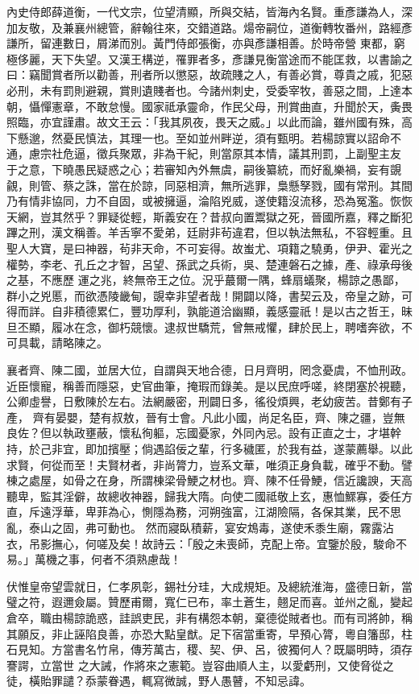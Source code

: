 \begin{pinyinscope}
 內史侍郎薛道衡，一代文宗，位望清顯，所與交結，皆海內名賢。重彥謙為人，深加友敬，及兼襄州總管，辭翰往來，交錯道路。煬帝嗣位，道衡轉牧番州，路經彥謙所，留連數日，屑涕而別。黃門侍郎張衡，亦與彥謙相善。於時帝營
 東都，窮極侈麗，天下失望。又漢王構逆，罹罪者多，彥謙見衡當途而不能匡救，以書諭之曰：竊聞賞者所以勸善，刑者所以懲惡，故疏賤之人，有善必賞，尊貴之戚，犯惡必刑，未有罰則避親，賞則遺賤者也。今諸州刺史，受委宰牧，善惡之間，上達本朝，懾憚憲章，不敢怠慢。國家祗承靈命，作民父母，刑賞曲直，升聞於天，夤畏照臨，亦宜謹肅。故文王云：「我其夙夜，畏天之威。」以此而論，雖州國有殊，高下懸邈，然憂民慎法，其理一也。至如並州畔逆，須有甄明。若楊諒實以詔命不通，慮宗社危逼，徵兵聚眾，非為干紀，則當原其本情，議其刑罰，上副聖主友
 于之意，下曉愚民疑惑之心；若審知內外無虞，嗣後纂統，而好亂樂禍，妄有覬覦，則管、蔡之誅，當在於諒，同惡相濟，無所逃罪，梟懸孥戮，國有常刑。其間乃有情非協同，力不自固，或被擁逼，淪陷兇威，遂使籍沒流移，恐為冤濫。恢恢天網，豈其然乎？罪疑從輕，斯義安在？昔叔向置鬻獄之死，晉國所嘉，釋之斷犯蹕之刑，漢文稱善。羊舌寧不愛弟，廷尉非茍違君，但以執法無私，不容輕重。且聖人大寶，是曰神器，茍非天命，不可妄得。故蚩尤、項籍之驍勇，伊尹、霍光之權勢，李老、孔丘之才智，呂望、孫武之兵術，吳、楚連磐石之據，產、祿承母後之基，不應歷
 運之兆，終無帝王之位。況乎蕞爾一隅，蜂扇蟻聚，楊諒之愚鄙，群小之兇慝，而欲憑陵畿甸，覬幸非望者哉！開闢以降，書契云及，帝皇之跡，可得而詳。自非積德累仁，豐功厚利，孰能道洽幽顯，義感靈祇！是以古之哲王，昧旦丕顯，履冰在念，御朽競懷。逮叔世驕荒，曾無戒懼，肆於民上，聘嗜奔欲，不可具載，請略陳之。



 襄者齊、陳二國，並居大位，自謂與天地合德，日月齊明，罔念憂虞，不恤刑政。近臣懷寵，稱善而隱惡，史官曲筆，掩瑕而錄美。是以民庶呼嗟，終閉塞於視聽，公卿虛譽，日敷陳於左右。法網嚴密，刑闢日多，徭役煩興，老幼疲苦。昔鄭有子產，
 齊有晏嬰，楚有叔敖，晉有士會。凡此小國，尚足名臣，齊、陳之疆，豈無良佐？但以執政壅蔽，懷私徇軀，忘國憂家，外同內忌。設有正直之士，才堪幹持，於己非宜，即加擯壓；倘遇諂佞之輩，行多穢匿，於我有益，遂蒙薦舉。以此求賢，何從而至！夫賢材者，非尚膂力，豈系文華，唯須正身負載，確乎不動。譬棟之處屋，如骨之在身，所謂棟梁骨鯁之材也。齊、陳不任骨鯁，信近讒諛，天高聽卑，監其淫僻，故總收神器，歸我大隋。向使二國祗敬上玄，惠恤鰥寡，委任方直，斥遠浮華，卑菲為心，惻隱為務，河朔強富，江湖險隔，各保其業，民不思亂，泰山之固，弗可動也。
 然而寢臥積薪，宴安鴆毒，遂使禾黍生廟，霧露沾衣，吊影撫心，何嗟及矣！故詩云：「殷之未喪師，克配上帝。宜鑒於殷，駿命不易。」萬機之事，何者不須熟慮哉！



 伏惟皇帝望雲就日，仁孝夙彰，錫社分珪，大成規矩。及總統淮海，盛德日新，當璧之符，遐邇僉屬。贊歷甫爾，寬仁已布，率土蒼生，翹足而喜。並州之亂，變起倉卒，職由楊諒詭惑，詿誤吏民，非有構怨本朝，棄德從賊者也。而有司將帥，稱其願反，非止誣陷良善，亦恐大點皇猷。足下宿當重寄，早預心膂，粵自籓邸，柱石見知。方當書名竹帛，傳芳萬古，稷、契、伊、呂，彼獨何人？既屬明時，須存謇諤，立當世
 之大誡，作將來之憲範。豈容曲順人主，以愛虧刑，又使脅從之徒，橫貽罪譴？忝蒙眷遇，輒寫微誠，野人愚瞽，不知忌諱。




\end{pinyinscope}
